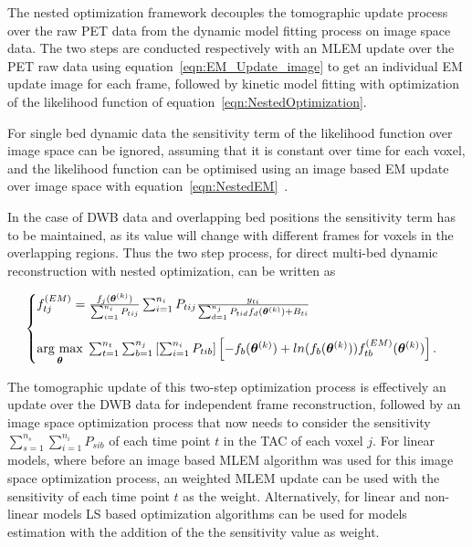The nested optimization framework decouples the tomographic update process over the raw PET data from the dynamic model fitting process on image space data. The two steps are conducted respectively with an MLEM update over the PET raw data using equation~\ref{eqn:EM_Update_image} to get an individual EM update image for each frame, followed by kinetic model fitting with optimization of the likelihood function of equation~\ref{eqn:NestedOptimization}. 

For single bed dynamic data the sensitivity term of the likelihood function over image space can be ignored, assuming that it is constant over time for each voxel, and the likelihood function can be optimised using an image based EM update over image space with equation~\ref{eqn:NestedEM}~\cite{Wang2010,Reader2014}.

In the case of DWB data and overlapping bed positions the sensitivity term has to be maintained, as its value will change with different frames for voxels in the overlapping regions.
Thus the two step process, for direct multi-bed dynamic reconstruction with nested optimization, can be written as

\begin{equation}
\label{eq3_3:NestedMultibed}
\text{}
\begin{cases}  
f_{tj}^{(EM)} = \frac{f_j(\bm\theta^{(k)})}{\sum_{i=1}^{n_i} P_{tij}} 
\sum_{i=1}^{n_i} P_{tij} 
\frac{y_{ti}}{\sum_{d=1}^{n_j} P_{tid} f_d(\bm\theta^{(k)}) + B_{ti} } \\ \\
\underset{\bm{\theta}}{\operatorname{arg}\,\operatorname{max}}\; 
\sum_{t=1}^{n_t} \sum_{b=1}^{n_j} \left[ \sum_{i=1}^{n_i}  P_{tib} \right]
\left[ -f_b(\bm\theta^{(k)}) + 
ln( f_b(\bm\theta^{(k)})) 
f_{tb}^{(EM)}(\bm{\theta}^{(k)})
\right] .\\
\end{cases}
\end{equation}

The tomographic update of this two-step optimization process is effectively an update over the DWB data for independent frame reconstruction, followed by an image space optimization process that now needs to consider the sensitivity $\sum_{s=1}^{n_s} \sum_{i=1}^{n_i}  P_{sib}$ of each time point $t$ in the TAC of each voxel $j$. For linear models, where before an image based MLEM algorithm was used for this image space optimization process, an weighted MLEM update can be used with the sensitivity of each time point $t$ as the weight. Alternatively, for linear and non-linear models LS based optimization algorithms can be used for models estimation with the addition of the the sensitivity value as weight.
%

%

